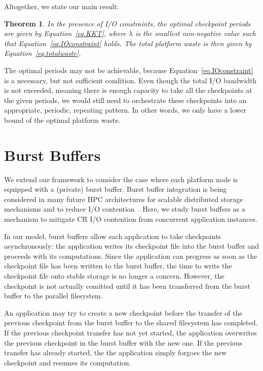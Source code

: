 \documentclass[two]{article}
\newtheorem{theorem}{Theorem}
\begin{document}
Altogether, we state our main result:

\begin{theorem}
     In the presence of I/O constraints, the optimal checkpoint periods are given by
     Equation~\eqref{eq.KKT}, where $\lambda$ is the smallest non-negative value such
     that Equation~\eqref{eq.IOconstraint} holds. The total platform waste is then
     given by Equation~\eqref{eq.totalwaste}.
\end{theorem}

The optimal periods may not be achievable, because
Equation~\eqref{eq.IOconstraint} is a necessary, but not sufficient condition.
Even though the total I/O bandwidth is not exceeded, meaning there is enough
capacity to take all the checkpoints at the given periods, we would still need
to orchestrate these checkpoints into an appropriate, periodic, repeating
pattern.  In other words, we only have a lower bound of the optimal platform
waste.

\section{Burst Buffers}
\label{sec:burstbuffers}

We extend our framework to consider the case where each platform node is equipped
with a (private) burst buffer.  Burst buffer integration is being considered in many
future HPC architectures for scalable distributed storage mechanisms and to reduce
I/O contention~\cite{amm2014,ammecp2018}.  Here, we study burst buffers as a
mechanism to mitigate CR I/O contention from concurrent application instances.

In our model, burst buffers allow each application to take checkpoints
asynchronously: the application writes its checkpoint file into the burst buffer and
proceeds with its computations. Since the application can progress as soon as the
checkpoint file has been written to the burst buffer, the time to write the
checkpoint file onto stable storage is no longer a concern.  However, the checkpoint
is not actually comitted until it has been transferred from the burst buffer to the
parallel filesystem.

An application may try to create a new checkpoint before the transfer of the previous
checkpoint from the burst buffer to the shared filesystem has completed. If the
previous checkpoint transfer has not yet started, the application overwrites the
previous checkpoint in the burst buffer with the new one. If the previous transfer
has already started, the the application simply forgoes the new checkpoint and
resumes its computation.
 
\end{document}
